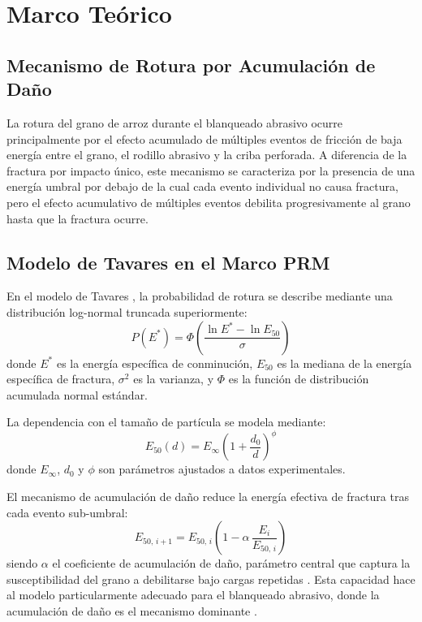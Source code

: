 \documentclass[conference]{IEEEtran}
\begin{document}
\section{Marco Teórico}

\subsection{Mecanismo de Rotura por Acumulación de Daño}
La rotura del grano de arroz durante el blanqueado abrasivo ocurre principalmente por el efecto acumulado de múltiples eventos de fricción de baja energía entre el grano, el rodillo abrasivo y la criba perforada. A diferencia de la fractura por impacto único, este mecanismo se caracteriza por la presencia de una energía umbral por debajo de la cual cada evento individual no causa fractura, pero el efecto acumulativo de múltiples eventos debilita progresivamente al grano hasta que la fractura ocurre.

\subsection{Modelo de Tavares en el Marco PRM}
En el modelo de Tavares \cite{tavares1998}, la probabilidad de rotura se describe mediante una distribución log-normal truncada superiormente:
\begin{equation}
P(E^{*}) = \Phi\!\left(\frac{\ln E^{*} - \ln E_{50}}{\sigma}\right)
\label{eq:prob}
\end{equation}
\noindent donde $E^{*}$ es la energía específica de conminución, $E_{50}$ es la mediana de la energía específica de fractura, $\sigma^{2}$ es la varianza, y $\Phi$ es la función de distribución acumulada normal estándar.

La dependencia con el tamaño de partícula se modela mediante:
\begin{equation}
E_{50}(d) = E_{\infty}\left(1 + \frac{d_{0}}{d}\right)^{\phi}
\label{eq:e50}
\end{equation}
\noindent donde $E_{\infty}$, $d_{0}$ y $\phi$ son parámetros ajustados a datos experimentales.

El mecanismo de acumulación de daño reduce la energía efectiva de fractura tras cada evento sub-umbral:
\begin{equation}
E_{50,\,i+1} = E_{50,\,i}\left(1 - \alpha\,\frac{E_{i}}{E_{50,\,i}}\right)
\label{eq:dano}
\end{equation}
\noindent siendo $\alpha$ el coeficiente de acumulación de daño, parámetro central que captura la susceptibilidad del grano a debilitarse bajo cargas repetidas \cite{rocky2024}. Esta capacidad hace al modelo particularmente adecuado para el blanqueado abrasivo, donde la acumulación de daño es el mecanismo dominante \cite{chiaravalle2025}.
\end{document}
